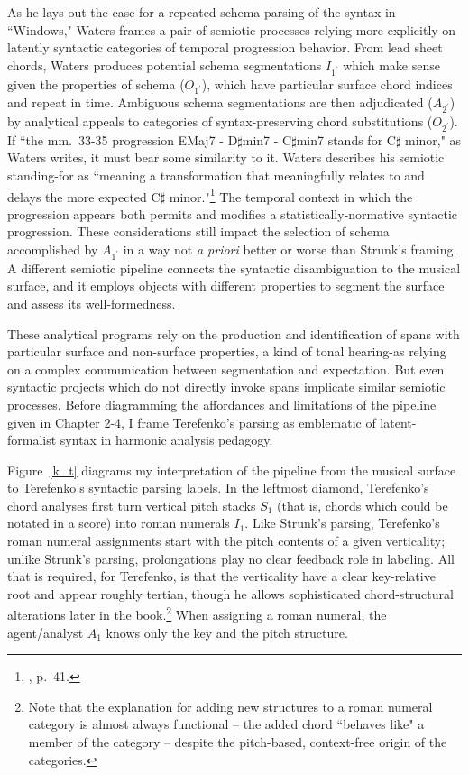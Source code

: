 As he lays out the case for a repeated-schema parsing of the syntax in ``Windows," Waters frames a pair of semiotic processes relying more explicitly on latently syntactic categories of temporal progression behavior.  From lead sheet chords, Waters produces potential schema segmentations $I_{1^{\prime}}$ which make sense given the properties of schema ($O_{1^{\prime}}$), which have particular surface chord indices and repeat in time.  Ambiguous schema segmentations are then adjudicated ($A_{2^{\prime}}$) by analytical appeals to categories of syntax-preserving chord substitutions ($O_{2^{\prime}}$).  If ``the mm.\ 33-35 progression EMaj7 - D$\sharp$min7 - C$\sharp$min7 stands for C$\sharp$ minor," as Waters writes, it must bear some similarity to it. Waters describes his semiotic standing-for as ``meaning a transformation that meaningfully relates to and delays the more expected C$\sharp$ minor."\footnote{\cite{waters2016}, p.\ 41.}  The temporal context in which the progression appears both permits and modifies a statistically-normative syntactic progression.  These considerations still impact the selection of schema accomplished by $A_{1^{\prime}}$ in a way not \emph{a priori} better or worse than Strunk's framing.  A different semiotic pipeline connects the syntactic disambiguation to the musical surface, and it employs objects with different properties to segment the surface and assess its well-formedness.

These analytical programs rely on the production and identification of spans with particular surface and non-surface properties, a kind of tonal hearing-as relying on a complex communication between segmentation and expectation.  But even syntactic projects which do not directly invoke spans implicate similar semiotic processes.  Before diagramming the affordances and limitations of the pipeline given in Chapter 2-4, I frame Terefenko's parsing as emblematic of latent-formalist syntax in harmonic analysis pedagogy.

Figure~\ref{k_t} diagrams my interpretation of the pipeline from the musical surface to Terefenko's syntactic parsing labels.  In the leftmost diamond, Terefenko's chord analyses first turn vertical pitch stacks $S_1$ (that is, chords which could be notated in a score) into roman numerals $I_1$.  Like Strunk's parsing, Terefenko's roman numeral assignments start with the pitch contents of a given verticality; unlike Strunk's parsing, prolongations play no clear feedback role in labeling.  All that is required, for Terefenko, is that the verticality have a clear key-relative root and appear roughly tertian, though he allows sophisticated chord-structural alterations later in the book.\footnote{Note that the explanation for adding new structures to a roman numeral category is almost always functional -- the added chord ``behaves like" a member of the category -- despite the pitch-based, context-free origin of the categories.}  When assigning a roman numeral, the agent/analyst $A_1$ knows only the key and the pitch structure.


